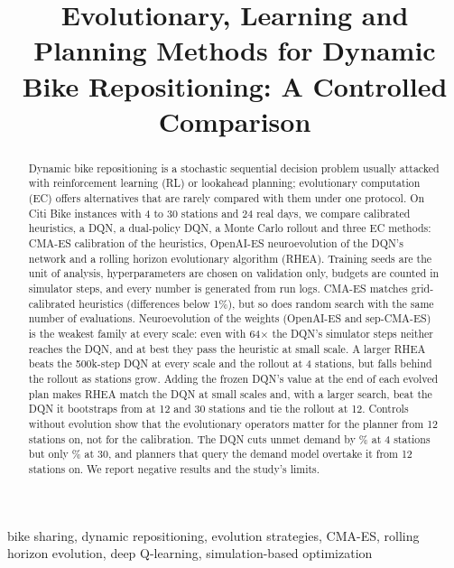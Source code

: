 \documentclass[conference,a4paper]{IEEEtran}
\begin{document}
\title{Evolutionary, Learning and Planning Methods for Dynamic Bike Repositioning: A Controlled Comparison}
\author{}
\maketitle

\begin{abstract}
Dynamic bike repositioning is a stochastic sequential decision problem usually attacked with reinforcement learning (RL) or lookahead planning; evolutionary computation
(EC) offers alternatives that are rarely compared with them under one protocol. On Citi Bike instances with 4 to 30 stations and 24 real days, we compare calibrated
heuristics, a DQN, a dual-policy DQN, a Monte Carlo rollout and three EC methods: CMA-ES calibration of the heuristics, OpenAI-ES neuroevolution of the DQN's network and
a rolling horizon evolutionary algorithm (RHEA). Training seeds are the unit of analysis, hyperparameters are chosen on validation only, budgets are counted in simulator
steps, and every number is generated from run logs. CMA-ES matches grid-calibrated heuristics (differences below 1\%), but so does random search with the same number of evaluations. Neuroevolution of the weights (OpenAI-ES and sep-CMA-ES) is the weakest family at every scale:
even with 64$\times$ the DQN's simulator steps neither reaches the DQN, and at best they pass the heuristic at small scale. A larger RHEA beats the
500k-step DQN at every scale and the rollout at 4 stations, but falls behind the rollout as stations grow. Adding the frozen DQN's value at the end of each evolved plan
makes RHEA match the DQN at small scales and, with a larger search, beat the DQN it bootstraps from at 12 and 30 stations and tie the rollout at 12. Controls without evolution show that the evolutionary operators matter for the planner from 12 stations on, not for the calibration. The DQN cuts unmet demand by \cecRDqnA\% at 4 stations but
only \cecRDqnE\% at 30, and planners that query the demand model overtake it from 12 stations on. We report negative results and the study's limits.
\end{abstract}

\begin{IEEEkeywords}
bike sharing, dynamic repositioning, evolution strategies, CMA-ES, rolling horizon evolution, deep Q-learning, simulation-based optimization
\end{IEEEkeywords}
\end{document}
